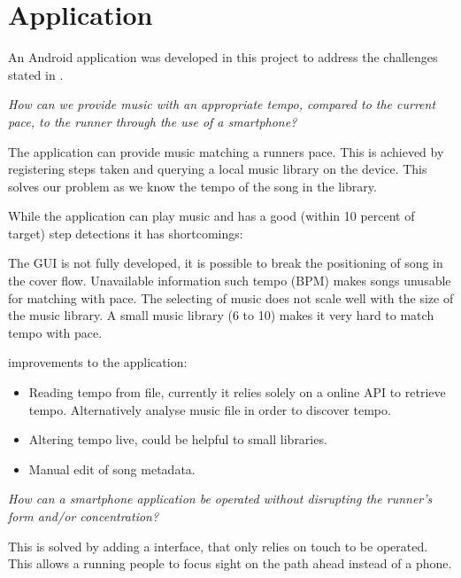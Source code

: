 \section{Application}
An Android application was developed in this project to address the challenges stated in .

\begin{center}
\textit{How can we provide music with an appropriate tempo, compared to the current pace, to the runner through the use of a smartphone?}
\end{center}
The application can provide music matching a runners pace. This is achieved by registering steps taken and querying a local music library on the device. This solves our problem as we know the tempo of the song in the library.

While the application can play music and has a good (within 10 percent of target) step detections it has shortcomings: 

The GUI is not fully developed, it is possible to break the positioning of song in the cover flow. Unavailable information such tempo (BPM) makes songs unusable for matching with pace. The selecting of music does not scale well with the size of the music library. A small music library (6 to 10) makes it very hard to match tempo with pace. 

improvements to the application:
\begin{itemize}
\item Reading tempo from file, currently it relies solely on a online API to retrieve tempo.
\subitem Alternatively analyse music file in order to discover tempo.
\item Altering tempo live, could be helpful to small libraries.
\item Manual edit of song metadata. 
\end{itemize}


\begin{center}
\textit{How can a smartphone application be operated without disrupting the runner's form and/or concentration?}
\end{center}
This is solved by adding a interface, that only relies on touch to be operated. This allows a running people to focus sight on the path ahead instead of a phone. 






